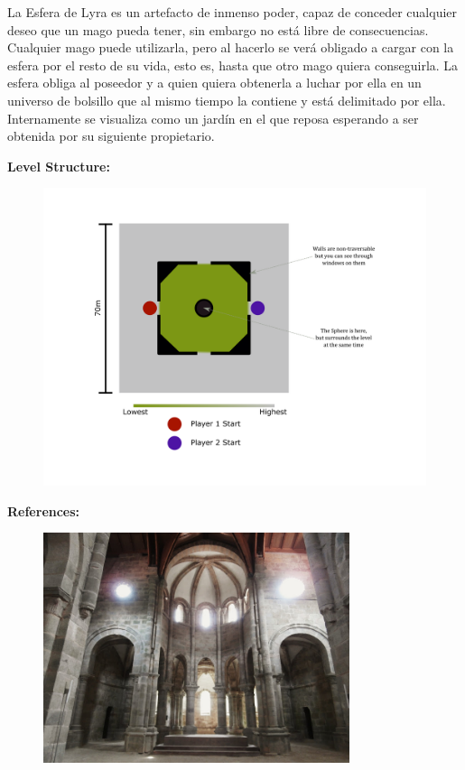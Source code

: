 \documentclass[12pt]{report}
\begin{document}
La Esfera de Lyra es un artefacto de inmenso poder, capaz de conceder cualquier deseo que un mago pueda tener, sin embargo no está libre de consecuencias. Cualquier mago puede utilizarla, pero al hacerlo se verá obligado a cargar con la esfera por el resto de su vida, esto es, hasta que otro mago quiera conseguirla. La esfera obliga al poseedor y a quien quiera obtenerla a luchar por ella en un universo de bolsillo que al mismo tiempo la contiene y está delimitado por ella. Internamente se visualiza como un jardín en el que reposa esperando a ser obtenida por su siguiente propietario.

\textbf{Level Structure:}

\begin{figure}[h]
    \centering
    \includegraphics[width=1.2\textwidth]{sphere_of_lyra_map}
\end{figure}

\newpage
\textbf{References:}

\begin{figure}[h]
    \centering
    \includegraphics[width=0.8\textwidth]{sphere_of_lyra_1}
\end{figure}
\end{document}
